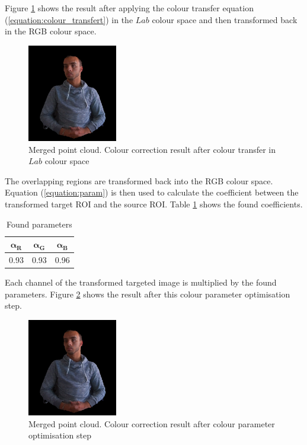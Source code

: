 Figure \ref{figure:overlap_region_lab} shows the result after applying the colour transfer equation (\ref{equation:colour_transfert}) in the $Lab$ colour space and then transformed back in the RGB colour space.

\begin{figure}[H]
    \centering
    \includegraphics[width=0.35\textwidth]{images/visual_enhancement/colour/overlap_region_lab.png}
    \caption{Merged point cloud. Colour correction result after colour transfer in $Lab$ colour space}
    \label{figure:overlap_region_lab}
\end{figure}


The overlapping regions are transformed back into the RGB colour space. Equation (\ref{equation:param}) is then used to calculate the coefficient between the transformed target ROI and the source ROI. Table \ref{tab:parameters} shows the found coefficients.

\begin{table}[H]
\centering
    \begin{tabular}{c|c|c}
    \textbf{$\mathbf{\alpha_{R}}$} & \textbf{$\mathbf{\alpha_{G}}$} & \textbf{$\mathbf{\alpha_{B}}$} \\ \hline
    0.93 & 0.93 & 0.96
    \end{tabular}
\caption{Found parameters}
\label{tab:parameters}
\end{table}



Each channel of the transformed targeted image is multiplied by the found parameters. Figure \ref{figure:param_opt_lab} shows the result after this colour parameter optimisation step. 

\begin{figure}[H]
    \centering
    \includegraphics[width=0.35\textwidth]{images/visual_enhancement/colour/param_opt_lab.png}
    \caption{Merged point cloud. Colour correction result after colour parameter optimisation step}
    \label{figure:param_opt_lab}
\end{figure}

